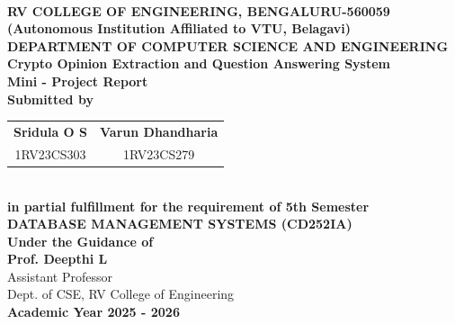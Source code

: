
\begin{titlepage}
\begin{center}

\textbf{\Large RV COLLEGE OF ENGINEERING\textsuperscript{\textregistered}, BENGALURU-560059}\\[0.3cm]
\textbf{(Autonomous Institution Affiliated to VTU, Belagavi)}\\[0.5cm]
\textbf{DEPARTMENT OF COMPUTER SCIENCE AND ENGINEERING}\\[2cm]

\textbf{\LARGE Crypto Opinion Extraction and Question Answering System}\\[1cm]

\textbf{\Large Mini - Project Report}\\[2cm]

\textbf{Submitted by}\\[0.5cm]
\begin{tabular}{c c}
\textbf{Sridula O S} & \textbf{Varun Dhandharia} \\
1RV23CS303 & 1RV23CS279
\end{tabular}\\[2cm]

\textbf{in partial fulfillment for the requirement of 5th Semester}\\[0.3cm]
\textbf{DATABASE MANAGEMENT SYSTEMS (CD252IA)}\\[2cm]

\textbf{Under the Guidance of}\\[0.5cm]
\textbf{Prof. Deepthi L}\\
Assistant Professor\\
Dept. of CSE, RV College of Engineering\\[1cm]

\textbf{Academic Year 2025 - 2026}

\end{center}
\end{titlepage}
